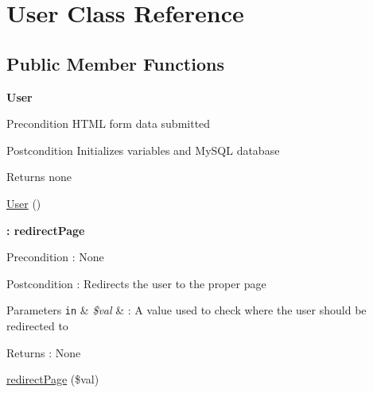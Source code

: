 \hypertarget{class_user}{}\section{User Class Reference}
\label{class_user}
\subsection*{Public Member Functions}
\begin{Indent}{\bf User}\par
{\em \begin{DoxyPrecond}{Precondition}
H\+T\+ML form data submitted 
\end{DoxyPrecond}
\begin{DoxyPostcond}{Postcondition}
Initializes variables and My\+S\+QL database 
\end{DoxyPostcond}
\begin{DoxyReturn}{Returns}
none 
\end{DoxyReturn}
}\begin{DoxyCompactItemize}
\item 
\hyperlink{class_user_aa67031b663e39314207197d3b5dfd735}{User} ()
\end{DoxyCompactItemize}
\end{Indent}
\begin{Indent}{\bf \+: redirect\+Page}\par
{\em \begin{DoxyPrecond}{Precondition}
\+: None 
\end{DoxyPrecond}
\begin{DoxyPostcond}{Postcondition}
\+: Redirects the user to the proper page 
\end{DoxyPostcond}

\begin{DoxyParams}[1]{Parameters}
\mbox{\tt in}  & {\em \$val} & \+: A value used to check where the user should be redirected to \\
\hline
\end{DoxyParams}
\begin{DoxyReturn}{Returns}
\+: None 
\end{DoxyReturn}
}\begin{DoxyCompactItemize}
\item 
\hyperlink{class_user_af2a5b1d0f21a4d7df3949d9115d3c5a8}{redirect\+Page} (\$val)
\end{DoxyCompactItemize}
\end{Indent}
